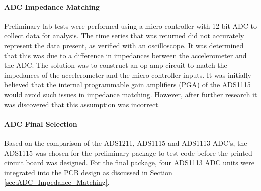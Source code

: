 \paragraph{ADC Impedance Matching}
\label{sec:ADC_Impedance_Issues}
Preliminary lab tests were performed using a micro-controller with 12-bit ADC to collect data for analysis.
The time series that was returned did not accurately represent the data present, as verified with an oscilloscope.
It was determined that this was due to a difference in impedances between the accelerometer and the ADC.
The solution was to construct an op-amp circuit to match the impedances of the accelerometer and the micro-controller inputs.
It was initially believed that the internal programmable gain amplifiers (PGA) of the ADS1115 would avoid such issues in impedance matching.
However, after further research it was discovered that this assumption was incorrect.


\paragraph{ADC Final Selection}
\indent Based on the comparison of the ADS1211, ADS1115 and ADS1113 ADC's, the ADS1115 was chosen for the preliminary package to test code before the printed circuit board was designed.
For the final package, four ADS1113 ADC units were integrated into the PCB design as discussed in Section \ref{sec:ADC_Impedance_Matching}. 
